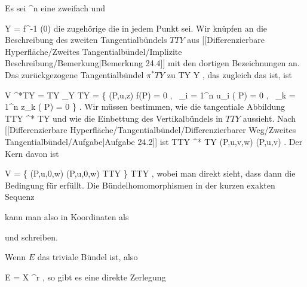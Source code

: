 {}
{

Es sei
 {\R^n } { \R
} {}
eine zweifach
und

\mavergleichskette
{\vergleichskette
{ Y
}
{ = }{ f^{-1} (0)
}
{  }{
}
{    }{
}
{   }{
}
}
{}{}{}
die zugehörige
die in jedem Punkt
sei. Wir knüpfen an die Beschreibung des zweiten Tangentialbündels $TTY$ aus
[[Differenzierbare Hyperfläche/Zweites Tangentialbündel/Implizite Beschreibung/Bemerkung|Bemerkung 24.4]]
mit den dortigen Bezeichnungen an. Das zurückgezogene Tangentialbündel $\pi^* TY$ zu
\maabbdisp {\pi} {TY} {Y
} {,}
das zugleich das
ist, ist

\mavergleichskettealign
{\vergleichskettealign
{ V
}
{ \cong} { \pi^*TY
}
{ =} { TY \times_Y TY
}
{ =} { \left\{ (P,u,z)  \mid  f(P) = 0 , \,  \sum_{i = 1}^n u_i {  } ( P) = 0   , \,  \sum_{k = 1}^n z_k {  } ( P) = 0    \right\}
}
{ } {
}
}
{}
{}{.}
Wir müssen bestimmen, wie die tangentiale Abbildung
 {TTY } { \pi^* TY
} {}
und wie die Einbettung des Vertikalbündels in $TTY$ aussieht. Nach
[[Differenzierbare Hyperfläche/Tangentialbündel/Differenzierbarer Weg/Zweites Tangentialbündel/Aufgabe|Aufgabe 24.2]]
ist
 {TTY} { \pi^* TY
} {(P,u,v,w)} { (P,u,v)
} {.}
Der Kern davon ist

\mavergleichskettedisp
{\vergleichskette
{ V
}
{ =} { \left\{  (P,u,0,w)   \mid   (P,u,0,w) \in TTY          \right\}
}
{ \subset} { TTY
}
{ } {
}
{ } {
}
}
{}{}{,}
wobei man direkt sieht, dass dann
 die Bedingung für
 erfüllt. Die Bündelhomomorphismen in der kurzen exakten Sequenz

 {  }

kann man also in Koordinaten als

 und
 schreiben.

}

Wenn $E$ das triviale Bündel ist, also

\mavergleichskette
{\vergleichskette
{ E
}
{ = }{ X \times \R^r
}
{  }{
}
{    }{
}
{   }{
}
}
{}{}{,}
so gibt es eine direkte Zerlegung
 {} {}


